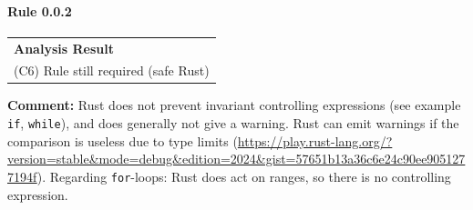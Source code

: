 \paragraph{Rule 0.0.2}
\begin{longtable}{p{13cm}}
\textbf{Analysis Result} \\
(C6) Rule still required (safe Rust) \\
\end{longtable}
\textbf{Comment:} Rust does not prevent invariant controlling expressions (see example \texttt{if}, \texttt{while}), and does generally not give a warning. Rust can emit warnings if the comparison is useless due to type limits (\url{https://play.rust-lang.org/?version=stable&mode=debug&edition=2024&gist=57651b13a36c6e24c90ee9051277194f}). Regarding \texttt{for}-loops: Rust does act on ranges, so there is no controlling expression. \\



